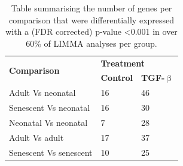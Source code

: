 \documentclass[alpha-refs]{wiley-article}
\newcommand{\tgf}{TGF-$\upbeta$}
\begin{document}
\begin{table}
	\centering
	\caption{Table summarising the number of genes per comparison that were differentially expressed with a (FDR corrected) p-value <0.001 in over 60\% of LIMMA analyses per group.}
	\begin{tabular}{|l|l|l|}
		\hline
		\multirow{2}{*}{\textbf{Comparison}} & \multicolumn{2}{l|}{\textbf{Treatment}} \\ \cline{2-3} 
		& \textbf{Control} & \textbf{\tgf{}} \\ \hline
		Adult Vs neonatal & 16 & 46 \\ \hline
		Senescent Vs neonatal & 16 & 30 \\ \hline
		Neonatal Vs neonatal & 7 & 28 \\ \hline
		Adult Vs adult & 17 & 37 \\ \hline
		Senescent Vs senescent & 10 & 25 \\ \hline
	\end{tabular}
	\label{table:stats_summary}
\end{table}
\end{document}
